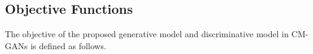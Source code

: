 \documentclass[journal]{IEEEtran}
\begin{document}


\subsection{Objective Functions}

The objective of the proposed generative model and discriminative model in CM-GANs is defined as follows.
\end{document}
